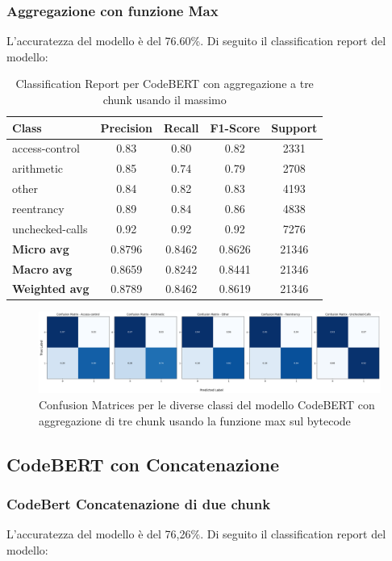 \documentclass[../../Thesis.tex]{subfiles}
\begin{document}
\subsubsection{Aggregazione con funzione Max}
L'accuratezza del modello \`e del 76.60\%. Di seguito il classification report del modello:
\begin{table}[H]
\centering
\small
\begin{tabular}{lcccc}
\hline
\textbf{Class} & \textbf{Precision} & \textbf{Recall} & \textbf{F1-Score} & \textbf{Support} \\
\hline
access-control & 0.83 & 0.80 & 0.82 & 2331 \\
arithmetic & 0.85 & 0.74 & 0.79 & 2708 \\
other & 0.84 & 0.82 & 0.83 & 4193 \\
reentrancy & 0.89 & 0.84 & 0.86 & 4838 \\
unchecked-calls & 0.92 & 0.92 & 0.92 & 7276 \\
\hline
\textbf{Micro avg} & 0.8796 & 0.8462 & 0.8626 & 21346 \\
\textbf{Macro avg} & 0.8659 & 0.8242 & 0.8441 & 21346 \\
\textbf{Weighted avg} & 0.8789 & 0.8462 & 0.8619 & 21346 \\
\hline
\end{tabular}
\caption{Classification Report per CodeBERT con aggregazione a tre chunk usando il massimo}
\end{table}
\begin{figure}[H]
    \includegraphics[width=1.05\textwidth]{../../img/CFMax3-BC.png}
    \caption{Confusion Matrices per le diverse classi del modello CodeBERT con aggregazione di tre chunk usando la funzione max sul bytecode}
\end{figure}

\subsection{CodeBERT con Concatenazione}
\subsubsection{CodeBert Concatenazione di due chunk}
L'accuratezza del modello \`e del 76,26\%. Di seguito il classification report del modello:
\end{document}

